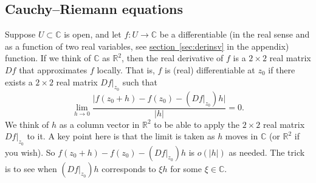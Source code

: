 \documentclass[12pt,openany]{book}
\newcommand{\sabs}[1]{\lvert {#1} \rvert}
\newcommand{\C}{{\mathbb{C}}}
\newcommand{\R}{{\mathbb{R}}}
\theoremstyle{plain}
\theoremstyle{remark}
\theoremstyle{definition}
\theoremstyle{exercise}
\theoremstyle{example}
\newcommand{\sectionref}[1]{\hyperref[#1]{section~\ref*{#1}}}
\begin{document}
\subsection{Cauchy--Riemann equations}

Suppose $U \subset \C$ is open, and
let $f \colon U \to \C$ be a
differentiable (in the real sense
and as a function of two real variables,
see \sectionref{sec:derinsv} in the appendix) function.
If we think of $\C$ as $\R^2$,
then the real derivative of $f$ is a $2 \times 2$ real matrix $D f$
that approximates $f$ locally.
That is, $f$ is (real) differentiable at $z_0$ if there exists
a $2 \times 2$ real matrix $Df|_{z_0}$ such that
\begin{equation*}
\lim_{h \to 0} \frac{\sabs{f(z_0+h) - f(z_0) - (Df|_{z_0}) h}}{\sabs{h}} = 0 .
\end{equation*}
We think of $h$ as a column vector in $\R^2$ 
to be able to apply the
$2 \times 2$ real matrix $Df|_{z_0}$ to it.
A key point here is that the limit is taken
as $h$ moves in $\C$ (or $\R^2$ if you wish).
So $f(z_0+h) - f(z_0) - (Df|_{z_0}) h$ is $o(\sabs{h})$ as needed.
The trick is to see when $(Df|_{z_0}) h$ corresponds to $\xi h$
for some $\xi \in \C$.
\end{document}
